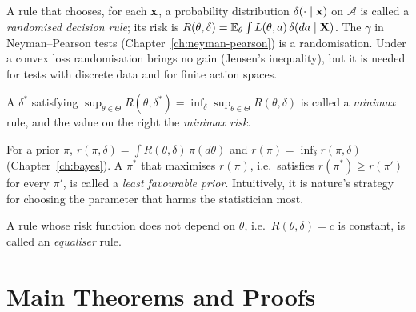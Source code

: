 \documentclass[main.tex]{subfiles}
\begin{document}
\begin{definition}
A rule that chooses, for each $\mathbf{x}$, a probability distribution $\delta(\cdot\mid\mathbf{x})$ on $\mathcal A$ is called a \emph{randomised decision rule}; its risk is $R(\theta,\delta)=\mathbb{E}_\theta\int L(\theta,a)\,\delta(da\mid\mathbf{X})$. The $\gamma$ in Neyman--Pearson tests (Chapter~\ref{ch:neyman-pearson}) is a randomisation. Under a convex loss randomisation brings no gain (Jensen's inequality), but it is needed for tests with discrete data and for finite action spaces.
\end{definition}

\begin{definition}\label{def:minimaks}
A $\delta^*$ satisfying $\displaystyle\sup_{\theta\in\Theta}R(\theta,\delta^*)=\inf_{\delta}\sup_{\theta\in\Theta}R(\theta,\delta)$ is called a \emph{minimax} rule, and the value on the right the \emph{minimax risk}.
\end{definition}

\begin{definition}\label{def:en-elverissiz}
For a prior $\pi$, $r(\pi,\delta)=\int R(\theta,\delta)\,\pi(d\theta)$ and $r(\pi)=\inf_\delta r(\pi,\delta)$ (Chapter~\ref{ch:bayes}). A $\pi^*$ that maximises $r(\pi)$, i.e.\ satisfies $r(\pi^*)\ge r(\pi')$ for every $\pi'$, is called a \emph{least favourable prior}. Intuitively, it is nature's strategy for choosing the parameter that harms the statistician most.
\end{definition}

\begin{definition}
A rule whose risk function does not depend on $\theta$, i.e.\ $R(\theta,\delta)=c$ is constant, is called an \emph{equaliser} rule.
\end{definition}

\section{Main Theorems and Proofs}
\end{document}
